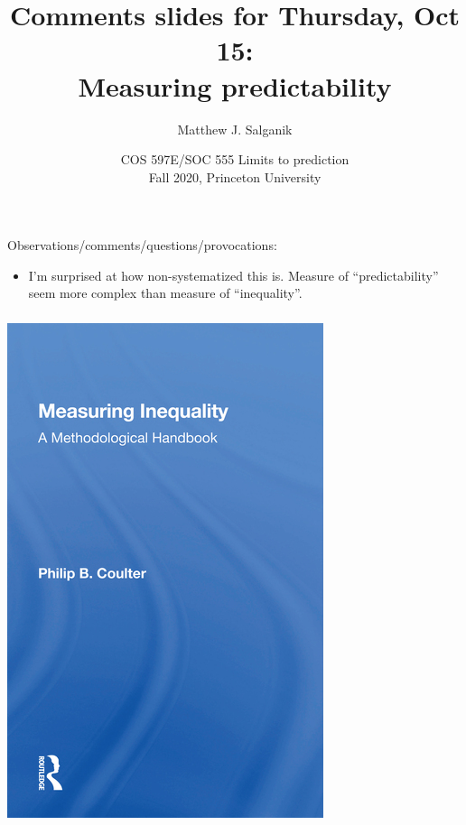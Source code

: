 \documentclass[aspectratio=169]{beamer}
\title[]{Comments slides for Thursday, Oct 15:\\Measuring predictability}
\author[]{Matthew J. Salganik}
\institute[]{}
\date[]{COS 597E/SOC 555 Limits to prediction\\Fall 2020, Princeton University}
\begin{document}
\frame{\titlepage}
\begin{frame}
\frametitle{}

Observations/comments/questions/provocations:
\begin{itemize}
\item I'm surprised at how non-systematized this is. Measure of ``predictability'' seem more complex than measure of ``inequality''.
\end{itemize}

\end{frame}
\begin{frame}
\frametitle{}

\begin{center}
\includegraphics[height=0.8\textheight]{figures/coulter_measuring_1989_cover}
\end{center}

\end{frame}
\end{document}
